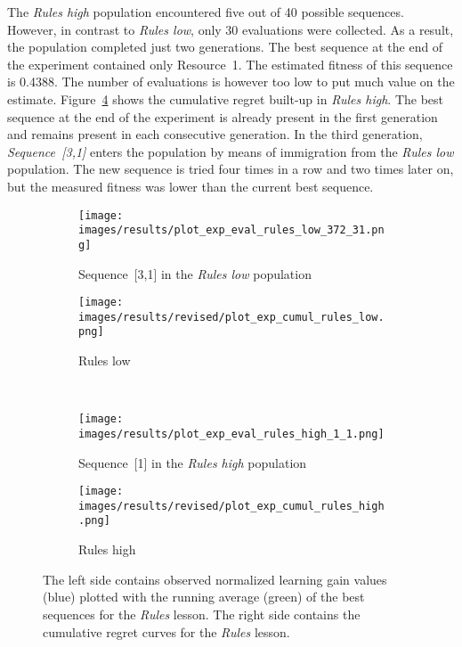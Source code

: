 \noindent
The \emph{Rules high} population encountered five out of 40 possible sequences.
However, in contrast to \emph{Rules low}, only 30 evaluations were collected.
As a result, the population completed just two generations. The best sequence at the
end of the experiment contained only Resource~1. The estimated fitness of this
sequence is 0.4388. The number of evaluations is however too low to put much
value on the estimate. Figure~\ref{fig:exp_cumul_rules_high} shows the
cumulative regret built-up in \emph{Rules high}. The best sequence at the end of the experiment is
already present in the first generation and remains present in each consecutive
generation. In the third generation, \emph{Sequence~[3,1]} enters the population
by means of immigration from the \emph{Rules low} population. The new sequence
is tried four times in a row and two times later on, but the measured fitness
was lower than the current best sequence.

\begin{figure}[ht]
	\centering
	\begin{subfigure}{0.6\linewidth}
	\centering
	\texttt{[image: images/results/plot\_exp\_eval\_rules\_low\_372\_31.png]}
	\caption{Sequence~[3,1] in the \emph{Rules low} population}
	\label{fig:exp_eval_rules_low_372}
	\end{subfigure}
	\hfill
	\begin{subfigure}{0.39\linewidth}
	\centering
	\texttt{[image: images/results/revised/plot\_exp\_cumul\_rules\_low.png]}
	\caption{Rules low}
	\label{fig:exp_cumul_rules_low}
	\end{subfigure}\\
	\begin{subfigure}{0.6\linewidth}
	\centering
	\texttt{[image: images/results/plot\_exp\_eval\_rules\_high\_1\_1.png]}
	\caption{Sequence~[1] in the \emph{Rules high} population}
	\label{fig:exp_eval_rules_high_1}
	\hfill
	\end{subfigure}
	\begin{subfigure}{0.39\linewidth}
	\centering
	\texttt{[image: images/results/revised/plot\_exp\_cumul\_rules\_high.png]}
	\caption{Rules high}
	\label{fig:exp_cumul_rules_high}
	\end{subfigure}
	\caption[Evaluations of best sequences and cumulative regret in
	Rules]{The left side contains observed normalized learning gain values
		(blue) plotted with the running average (green) of the best sequences
		for the \emph{Rules} lesson. The right side contains the cumulative
		regret curves for the \emph{Rules} lesson.}
	\label{fig:exp_eval_rules}
\end{figure}

